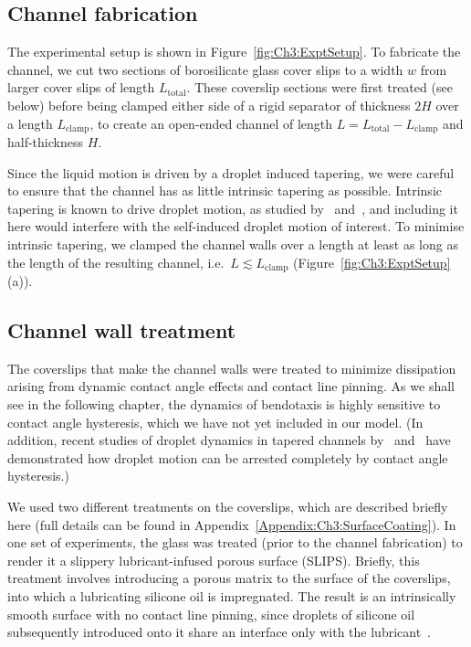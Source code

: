 \subsection{Channel fabrication}\label{S:Ch3:ExperimentalSetup:Manufacture}
The experimental setup is shown in Figure~\ref{fig:Ch3:ExptSetup}.  To fabricate the channel, we cut two sections of borosilicate glass cover slips to a width $w$ from larger cover slips of length $L_{\text{total}}$. These coverslip sections were first treated (see below) before being clamped either side of a rigid separator of thickness $2H$ over a length $L_{\text{clamp}}$, to create an open-ended channel of length $L = L_{\text{total}} - L_{\text{clamp}}$ and half-thickness $H$.

Since the liquid motion is driven by a droplet induced tapering, we were careful to ensure that the channel has as little intrinsic tapering as possible. Intrinsic tapering is known to drive droplet motion, as studied by~\cite{Renvoise2009EPL} and~\cite{Reyssat2014JFM}, and including it here would interfere with the self-induced droplet motion of interest. To minimise intrinsic tapering, we clamped the channel walls over a length at least as long as the length of the resulting channel, i.e.~$L \lesssim L_{\text{clamp}}$ (Figure~\ref{fig:Ch3:ExptSetup}(a)).

\subsection{Channel wall treatment}\label{S:Ch3:ExperimentalSetup:WallTreatment}
The coverslips that make the channel walls were treated to minimize dissipation arising from dynamic contact angle effects and contact line pinning. As we shall see in the following chapter, the dynamics of bendotaxis is highly sensitive to contact angle hysteresis, which we have not yet included in our model. (In addition, recent studies of droplet dynamics in tapered channels by~\cite{Prakash2008Science} and~\cite{Bush2010AdvCollIntsci} have demonstrated how droplet motion can be arrested completely by contact angle hysteresis.)

We used two different treatments on the coverslips, which are described briefly here (full details can be found in Appendix~\ref{Appendix:Ch3:SurfaceCoating}). In one set of experiments, the glass was treated (prior to the channel fabrication) to render it a slippery lubricant-infused porous surface (SLIPS). Briefly, this treatment involves introducing a porous matrix to the surface of the coverslips, into which a lubricating silicone oil is impregnated. The result is an intrinsically smooth surface with no contact line pinning, since droplets of silicone oil subsequently introduced onto it share an interface only with the lubricant~\citep{Wong2011Nature}.

